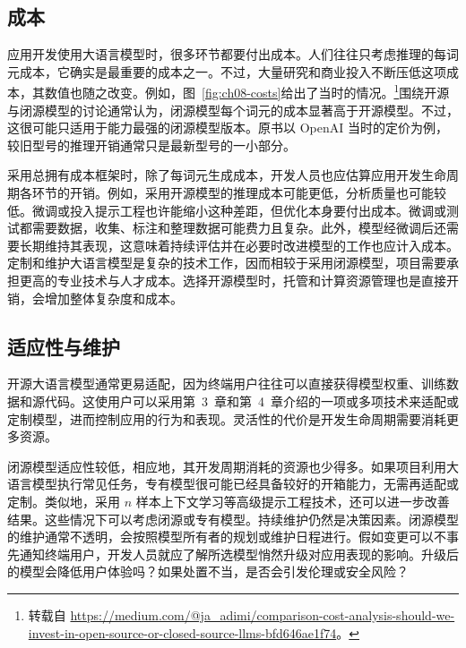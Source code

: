 \subsection{成本}
应用开发使用大语言模型时，很多环节都要付出成本。人们往往只考虑推理的每词元成本，它确实是最重要的成本之一。不过，大量研究和商业投入不断压低这项成本，其数值也随之改变。例如，图~\ref{fig:ch08-costs}给出了当时的情况。\footnote{转载自 \url{https://medium.com/@ja_adimi/comparison-cost-analysis-should-we-invest-in-open-source-or-closed-source-llms-bfd646ae1f74}。}围绕开源与闭源模型的讨论通常认为，闭源模型每个词元的成本显著高于开源模型。不过，这很可能只适用于能力最强的闭源模型版本。原书以 OpenAI 当时的定价为例，较旧型号的推理开销通常只是最新型号的一小部分。


采用总拥有成本框架时，除了每词元生成成本，开发人员也应估算应用开发生命周期各环节的开销。例如，采用开源模型的推理成本可能更低，分析质量也可能较低。微调或投入提示工程也许能缩小这种差距，但优化本身要付出成本。微调或测试都需要数据，收集、标注和整理数据可能费力且复杂。此外，模型经微调后还需要长期维持其表现，这意味着持续评估并在必要时改进模型的工作也应计入成本。定制和维护大语言模型是复杂的技术工作，因而相较于采用闭源模型，项目需要承担更高的专业技术与人才成本。选择开源模型时，托管和计算资源管理也是直接开销，会增加整体复杂度和成本。

\subsection{适应性与维护}
开源大语言模型通常更易适配，因为终端用户往往可以直接获得模型权重、训练数据和源代码。这使用户可以采用第~3~章和第~4~章介绍的一项或多项技术来适配或定制模型，进而控制应用的行为和表现。灵活性的代价是开发生命周期需要消耗更多资源。

闭源模型适应性较低，相应地，其开发周期消耗的资源也少得多。如果项目利用大语言模型执行常见任务，专有模型很可能已经具备较好的开箱能力，无需再适配或定制。类似地，采用 $n$ 样本上下文学习等高级提示工程技术，还可以进一步改善结果。这些情况下可以考虑闭源或专有模型。持续维护仍然是决策因素。闭源模型的维护通常不透明，会按照模型所有者的规划或维护日程进行。假如变更可以不事先通知终端用户，开发人员就应了解所选模型悄然升级对应用表现的影响。升级后的模型会降低用户体验吗？如果处置不当，是否会引发伦理或安全风险？


